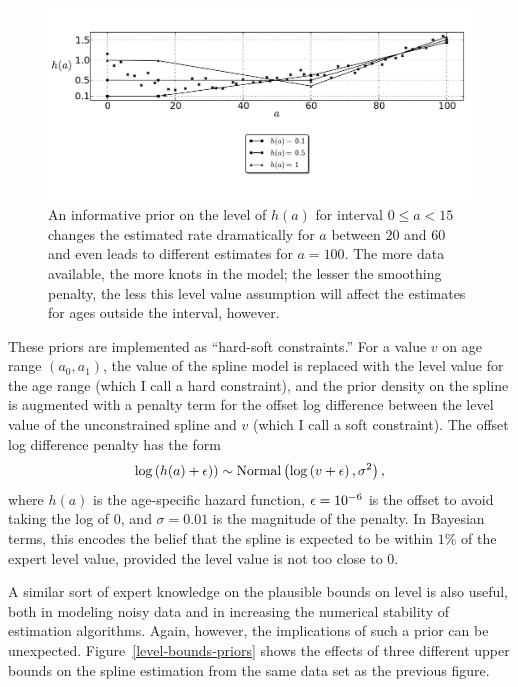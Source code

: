 \begin{figure}[h]
\begin{center}
\includegraphics[width=\textwidth]{level_value-smoothing-splines.pdf}
\caption[An informative prior on the level of $h(a)$.]{An informative
  prior on the level of $h(a)$ for interval $0 \leq a <
  15$ changes the estimated rate dramatically for $a$ between $20$ and
  $60$ and even leads to different estimates for $a = 100$.  The more
  data available, the more knots in the model; the lesser the
  smoothing penalty, the less this level value assumption will affect
  the estimates for ages outside the interval, however.  }
\label{level-value-priors}
\end{center}
\end{figure}



These priors are implemented as ``hard-soft constraints.''  For a
value $v$ on age range $(a_0,a_1)$, the value of the spline model is
replaced with the level value for the age range (which I call a hard
constraint), and the prior density on the spline is augmented with a
penalty term for the offset log difference between the level value of
the unconstrained spline and $v$ (which I call a soft constraint). The
offset log difference penalty has the form
\[
\log\left(h(a)+\epsilon)\right) \sim
 \operatorname{Normal}\left(\log\left(v + \epsilon\right), \sigma^2\right),
\]
where $h(a)$ is the age-specific hazard function, $\epsilon = 10^{-6}$ is the
offset to avoid taking the log of $0$, and $\sigma = 0.01$ is the
magnitude of the penalty.  In Bayesian terms, this encodes the belief
that the spline is expected to be within $1$\% of the expert level
value, provided the level value is not too close to $0$.

A similar sort of expert knowledge on the plausible bounds on
level is also useful, both in modeling noisy data and in increasing
the numerical stability of estimation algorithms. Again, however, the
implications of such a prior can be unexpected.
Figure~\ref{level-bounds-priors} shows the effects of three different
upper bounds on the spline estimation from the same data set as the
previous figure.

